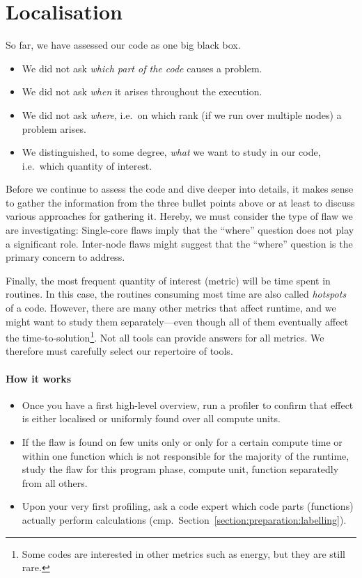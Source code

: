 \section{Localisation}
\label{section:tools:localisation}

So far, we have assessed our code as one big black box.

\begin{itemize}
  \item We did not ask \emph{which part of the code} causes a problem. 
  \item We did not ask \emph{when} it arises throughout the execution.
  \item We did not ask \emph{where}, i.e.~on which rank (if we run over multiple
  nodes) a problem arises.
  \item We distinguished, to some degree, \emph{what} we want to study in our
  code, i.e.~which quantity of interest.
\end{itemize}

\noindent
Before we continue to assess the code and dive deeper into details, it makes sense to gather the information from the three bullet points above or at least to discuss various approaches for gathering it.
Hereby, we must consider the type of flaw we are investigating:
Single-core flaws imply that the ``where'' question does not play a significant
role.
Inter-node flaws might suggest that the ``where'' question is the primary
concern to address.

Finally, the most frequent quantity of interest (metric) will be time spent in routines.
In this case, the routines consuming most time are also called \emph{hotspots} of a code.
However, there are many other metrics that affect runtime, and we might want to study them separately—even though all of them eventually affect the time-to-solution\footnote{Some codes are interested in other metrics such as energy, but they are still rare.}.
Not all tools can provide answers for all metrics.
We therefore must carefully select our repertoire of tools.




\paragraph*{How it works}

\begin{itemize}[noitemsep]
  \item[$\boxplus$] Once you have a first high-level overview, run a profiler to
  confirm that effect is either localised or uniformly found over all compute
  units.
  \item[$\boxplus$] If the flaw is found on few units only or only for a certain
  compute time or within one function which is not responsible for the majority
  of the runtime, study the flaw for this program phase, compute unit, function
  separatedly from all others.
  \item[$\boxplus$] Upon your very first profiling, ask a code expert which code parts (functions) actually perform calculations (cmp.~Section~\ref{section:preparation:labelling}).
\end{itemize}


